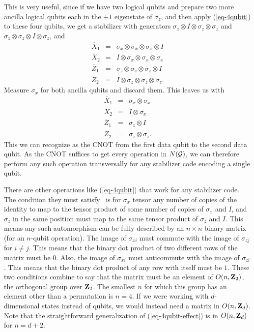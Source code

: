 \documentclass{report}
\newcommand{\G}{{\cal G}}
\newcommand{\X}{\sigma_x}
\newcommand{\Z}{\sigma_z}
\newcommand{\Xs}[1]{\sigma_{x{#1}}}
\newcommand{\Zs}[1]{\sigma_{z{#1}}}
\newcommand{\Xbar}{\overline{X}}
\newcommand{\Zbar}{\overline{Z}}
\begin{document}
This is very useful, since if we have two logical qubits and prepare two more 
ancilla logical qubits each in the $+1$ eigenstate of $\Z$, and then apply 
(\ref{eq-4qubit}) to these four qubits, we get a stabilizer with generators 
$\Z \otimes I \otimes \Z \otimes \Z$ and $\Z \otimes \Z \otimes I \otimes 
\Z$, and
\begin{eqnarray}
\Xbar_1 & = & \X \otimes \X \otimes \X \otimes I \nonumber \\
\Xbar_2 & = & I \otimes \X \otimes \X \otimes \X \\
\Zbar_1 & = & \Z \otimes \Z \otimes \Z \otimes I \nonumber \\
\Zbar_2 & = & I \otimes \Z \otimes \Z \otimes \Z. \nonumber
\end{eqnarray}
Measure $\X$ for both ancilla qubits and discard them.  This leaves us 
with
\begin{eqnarray}
\Xbar_1 & = & \X \otimes \X \nonumber \\
\Xbar_2 & = & I \otimes \X \\
\Zbar_1 & = & \Z \otimes I \nonumber \\
\Zbar_2 & = & \Z \otimes \Z. \nonumber
\end{eqnarray}
This we can recognize as the CNOT from the first data qubit to the second 
data qubit.  As the CNOT suffices to get every operation in $N(\G)$, we can 
therefore perform any such operation transversally for any stabilizer code 
encoding a single qubit.

There are other operations like (\ref{eq-4qubit}) that work for any 
stabilizer code.  The condition they must satisfy~\cite{rains-orthogonal} is 
for $\X$ tensor any number of copies of the identity to map to the tensor 
product of some number of copies of $\X$ and $I$, and $\Z$ in the same 
position must map to the same tensor product of $\Z$ and $I$.  This means 
any such automorphism can be fully described by an $n \times n$ binary 
matrix (for an $n$-qubit operation).  The image of $\Xs{i}$ must commute 
with the image of $\Zs{j}$ for $i \neq j$.  This means that the binary dot 
product of two different rows of the matrix must be $0$.  Also, the image 
of $\Xs{i}$ must anticommute with the image of $\Zs{i}$.  This means that 
the binary dot product of any row with itself must be $1$.  These two 
conditions combine to say that the matrix must be an element of $O(n, 
{\bf Z}_2)$, the orthogonal group over ${\bf Z}_2$.  The smallest $n$ for 
which this group has an element other than a permutation is $n=4$.  If we
were working with $d$-dimensional states instead of qubits, we would instead
need a matrix in $O(n, {\bf Z}_d)$.  Note that the straightforward
generalization of (\ref{eq-4qubit-effect}) is in $O(n, {\bf Z}_d)$ for
$n=d+2$.
\end{document}
